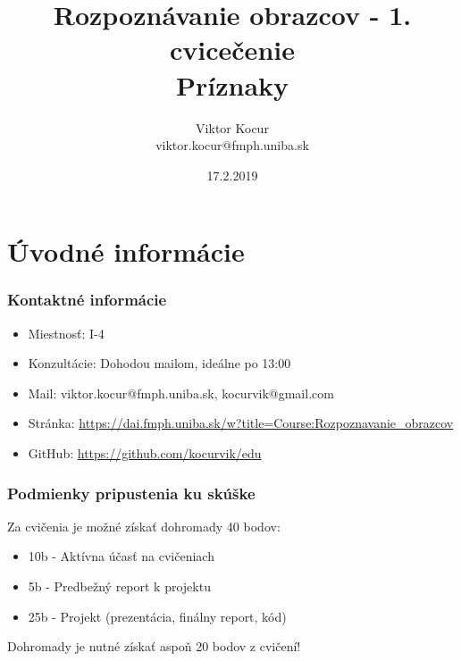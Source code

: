 \documentclass{beamer}
\title[Príznaky]{Rozpoznávanie obrazcov - 1. cvicečenie \\ Príznaky}
\author[Viktor Kocur]{Viktor Kocur \\{\small viktor.kocur@fmph.uniba.sk}}
\institute{DAI FMFI UK}
\date{17.2.2019}
\begin{document}

\begin{frame}[plain]
  \titlepage  
\end{frame}

\section{Úvodné informácie}

\begin{frame}
\frametitle{Kontaktné informácie}

\begin{itemize}\setlength\itemsep{1em}
\item Miestnosť: I-4
\item Konzultácie: Dohodou mailom, ideálne po 13:00
\item Mail: viktor.kocur@fmph.uniba.sk, kocurvik@gmail.com
\item Stránka: \url{https://dai.fmph.uniba.sk/w?title=Course:Rozpoznavanie_obrazcov}
\item GitHub: \url{https://github.com/kocurvik/edu}
\end{itemize}

\end{frame}


\begin{frame}
\frametitle{Podmienky pripustenia ku skúške}
Za cvičenia je možné získať dohromady 40 bodov:
\vspace{1em}
\begin{itemize}\setlength\itemsep{1em}
\item 10b - Aktívna účasť na cvičeniach
\item 5b - Predbežný report k projektu
\item 25b - Projekt (prezentácia, finálny report, kód)
\end{itemize}

\vspace{1em}
Dohromady je nutné získať aspoň 20 bodov z cvičení!
\end{frame}
\end{document}
